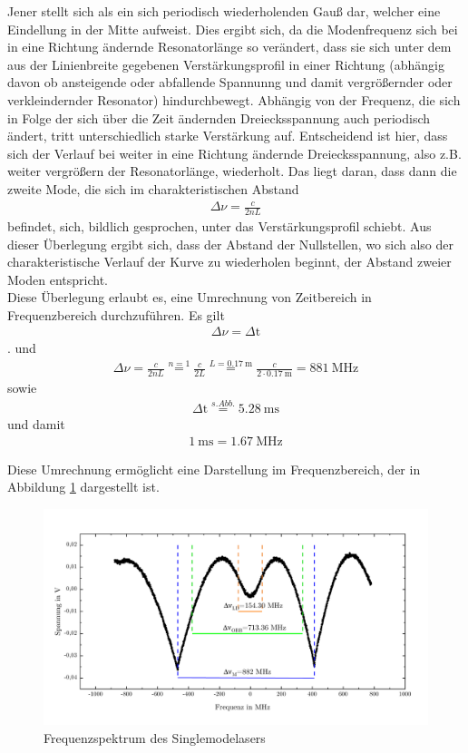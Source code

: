 \documentclass[a4paper,twoside,final]{article}
\begin{document}
Jener stellt sich als ein sich periodisch wiederholenden Gauß dar, welcher eine Eindellung in der Mitte aufweist. Dies ergibt sich, da die Modenfrequenz sich bei in eine Richtung ändernde Resonatorlänge so verändert, dass sie sich unter dem aus der Linienbreite gegebenen Verstärkungsprofil \glqq in einer Richtung (abhängig davon ob ansteigende oder abfallende Spannunng und damit vergrößernder oder verkleindernder Resonator) hindurchbewegt\grqq. Abhängig von der Frequenz, die sich in Folge der sich über die Zeit ändernden Dreiecksspannung auch periodisch ändert, tritt unterschiedlich starke Verstärkung auf. Entscheidend ist hier, dass sich der Verlauf bei weiter in eine Richtung ändernde Dreiecksspannung, also z.B. weiter vergrößern der Resonatorlänge, wiederholt. Das liegt daran, dass dann die zweite Mode, die sich im charakteristischen Abstand
\begin{align}
  \Delta \nu = \frac{c}{2nL}
\end{align}
befindet, sich, bildlich gesprochen, unter das Verstärkungsprofil schiebt. Aus dieser Überlegung ergibt sich, dass der Abstand der Nullstellen, wo sich also der charakteristische Verlauf der Kurve zu wiederholen beginnt, der Abstand zweier Moden entspricht.\\
Diese Überlegung erlaubt es, eine Umrechnung von Zeitbereich in Frequenzbereich durchzuführen. Es gilt
\begin{align}
  \Delta \nu = \Delta \text{t}
\end{align}.
und
\begin{align}
  \Delta \nu = \frac{c}{2nL} \overset{n=1}{=} \frac{c}{2L} \overset{L=\SI{0,17}{\meter}}{=} \frac{c}{2\cdot \SI{0,17}{\meter}}=\SI{881}{\mega\hertz}
\end{align}
sowie
\begin{align}
  \Delta \text{t} \overset{s. Abb.}=\SI{5,28}{\milli\second}
\end{align}
und damit
\begin{align}
  \SI{1}{\milli\second}=\SI{1,67}{\mega\hertz}
\end{align}

Diese Umrechnung ermöglicht eine Darstellung im Frequenzbereich, der in Abbildung \ref{fig:Frequenzverlauf} dargestellt ist.

\begin{figure}[htp]
    \centering
        \includegraphics[width=1\textwidth]{Bilder/Profil_SML_Frequenzbild.pdf}
    \caption{Frequenzspektrum des Singlemodelasers}
    \label{fig:Frequenzverlauf}
\end{figure}
\end{document}
